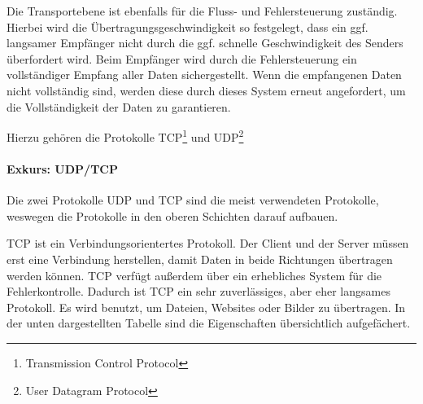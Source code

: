 \documentclass[12pt]{article}
\begin{document}
	Die Transportebene ist ebenfalls für die Fluss- und Fehlersteuerung zuständig. Hierbei wird die Übertragungsgeschwindigkeit so festgelegt, dass ein ggf. langsamer Empfänger nicht durch die ggf. schnelle Geschwindigkeit des Senders überfordert wird. Beim Empfänger wird durch die Fehlersteuerung ein vollständiger Empfang aller Daten sichergestellt. Wenn die empfangenen Daten nicht vollständig sind, werden diese durch dieses System erneut angefordert, um die Vollständigkeit der Daten zu garantieren. 
	
	Hierzu gehören die Protokolle TCP\footnote{Transmission Control Protocol} und UDP\footnote{User Datagram Protocol}

\paragraph{Exkurs: UDP/TCP}

Die zwei Protokolle UDP und TCP sind die meist verwendeten Protokolle, weswegen die Protokolle in den oberen Schichten darauf aufbauen. 

TCP ist ein Verbindungsorientertes Protokoll. Der Client und der Server müssen erst eine Verbindung herstellen, damit Daten in beide Richtungen übertragen werden können. TCP verfügt außerdem über ein erhebliches System für die Fehlerkontrolle. Dadurch ist TCP ein sehr zuverlässiges, aber eher langsames Protokoll. Es wird benutzt, um Dateien, Websites oder Bilder zu übertragen.\cite{tcp} In der unten dargestellten Tabelle sind die Eigenschaften übersichtlich aufgefächert. 

\begin{table}[h]
	\caption{TCP \cite{udp+tcp}}
	\label{fig:figure11}
\end{table}
\end{document}

